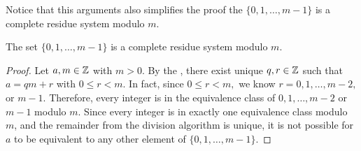 \documentclass[letterpaper, 11 pt]{ximera}
\begin{document}
 Notice that this arguments also simplifies the proof the $\{0,1,\dots,m-1\}$ is a complete residue system modulo $m$.
\begin{prop*}[Proposition 2.3]\label{prop:complete-residue}
The set $\{0,1,\dots,m-1\}$ is a complete residue system modulo $m$.
\end{prop*}
\begin{proof}
Let $a,m\in\mathbb Z$ with $m>0$. By the , there exist unique $q,r\in\mathbb Z$ such that $a=qm+r$ with $0\leq r <m$. In fact, since $0\leq r<m,$ we know $r=0,1,\dots, m-2,$ or $m-1$. Therefore, every integer is in the equivalence class of $0,1,\dots, m-2$ or $m-1$ modulo $m$.
Since every integer is in exactly one equivalence class modulo $m$, and the remainder from the division algorithm is unique, it is not possible for $a$ to be equivalent to any other element of $\{0,1,\dots,m-1\}$. 
\end{proof}
\end{document}
